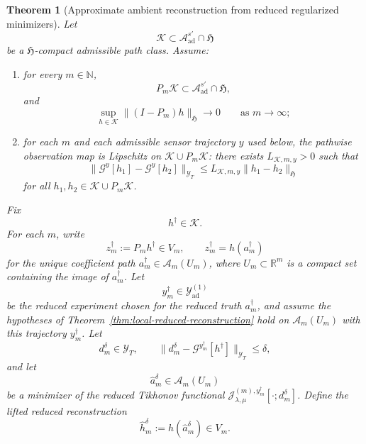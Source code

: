 \documentclass{article}
\newtheorem{theorem}{Theorem}[section]
\theoremstyle{definition}
\begin{document}
\begin{theorem}[Approximate ambient reconstruction from reduced regularized minimizers]
    \label{thm:ambient-approximate-recovery}
    Let
    \[
        \mathcal K\subset \mathcal A_{\mathrm{ad}}^{s'}\cap \mathfrak H
    \]
    be a \(\mathfrak H\)-compact admissible path class. Assume:
    \begin{enumerate}
        \item for every \(m\in\mathbb N\),
              \[
                  P_m\mathcal K\subset \mathcal A_{\mathrm{ad}}^{s'}\cap \mathfrak H,
              \]
              and
              \[
                  \sup_{h\in\mathcal K}\|(I-P_m)h\|_{\mathfrak H}\longrightarrow 0
                  \qquad\text{as }m\to\infty;
              \]
        \item for each \(m\) and each admissible sensor trajectory \(y\) used below, the pathwise
              observation map is Lipschitz on \(\mathcal K\cup P_m\mathcal K\): there exists
              \(L_{\mathcal K,m,y}>0\) such that
              \begin{equation}
                  \label{eq:ambient-observation-lipschitz-last-subsection}
                  \|\mathcal G^{y}[h_1]-\mathcal G^{y}[h_2]\|_{\mathcal Y_T}
                  \le
                  L_{\mathcal K,m,y}\|h_1-h_2\|_{\mathfrak H}
              \end{equation}
              for all \(h_1,h_2\in \mathcal K\cup P_m\mathcal K\).
    \end{enumerate}

    Fix
    \[
        h^\dagger\in\mathcal K.
    \]
    For each \(m\), write
    \[
        z_m^\dagger:=P_m h^\dagger\in V_m,
        \qquad
        z_m^\dagger=h(a_m^\dagger)
    \]
    for the unique coefficient path \(a_m^\dagger\in \mathcal A_m(U_m)\), where
    \(U_m\subset\mathbb R^m\) is a compact set containing the image of \(a_m^\dagger\).
    Let
    \[
        y_m^\dagger\in \mathcal Y_{\mathrm{ad}}^{(1)}
    \]
    be the reduced experiment chosen for the reduced truth \(a_m^\dagger\), and assume the
    hypotheses of Theorem~\ref{thm:local-reduced-reconstruction} hold on \(\mathcal A_m(U_m)\) with
    this trajectory \(y_m^\dagger\). Let
    \[
        d_m^\delta\in \mathcal Y_T,
        \qquad
        \|d_m^\delta-\mathcal G^{y_m^\dagger}[h^\dagger]\|_{\mathcal Y_T}\le \delta,
    \]
    and let
    \[
        \hat a_m^\delta\in \mathcal A_m(U_m)
    \]
    be a minimizer of the reduced Tikhonov functional
    \(\mathcal J_{\lambda,\mu}^{(m),y_m^\dagger}[\cdot;d_m^\delta]\). Define the lifted reduced
    reconstruction
    \[
        \hat h_m^\delta:=h(\hat a_m^\delta)\in V_m.
    \]


\end{theorem}
\end{document}
